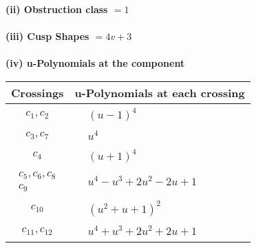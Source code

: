 \documentclass[1p]{elsarticle_modified}
\theoremstyle{definition}
\begin{document}
\flushleft \textbf{(ii) Obstruction class $= 1$}\\~\\
\flushleft \textbf{(iii) Cusp Shapes $= 4 v+3$}\\~\\
\newpage\renewcommand{\arraystretch}{1}
\flushleft \textbf{(iv) u-Polynomials at the component}\newline \\
\begin{tabular}{m{50pt}|m{274pt}}
Crossings & \hspace{64pt}u-Polynomials at each crossing \\
\hline $$\begin{aligned}c_{1},c_{2}\end{aligned}$$&$\begin{aligned}
&(u-1)^4
\end{aligned}$\\
\hline $$\begin{aligned}c_{3},c_{7}\end{aligned}$$&$\begin{aligned}
&u^4
\end{aligned}$\\
\hline $$\begin{aligned}c_{4}\end{aligned}$$&$\begin{aligned}
&(u+1)^4
\end{aligned}$\\
\hline $$\begin{aligned}c_{5},c_{6},c_{8}\\c_{9}\end{aligned}$$&$\begin{aligned}
&u^4- u^3+2 u^2-2 u+1
\end{aligned}$\\
\hline $$\begin{aligned}c_{10}\end{aligned}$$&$\begin{aligned}
&(u^2+u+1)^2
\end{aligned}$\\
\hline $$\begin{aligned}c_{11},c_{12}\end{aligned}$$&$\begin{aligned}
&u^4+u^3+2 u^2+2 u+1
\end{aligned}$\\
\hline
\end{tabular}\\~\\
\end{document}
